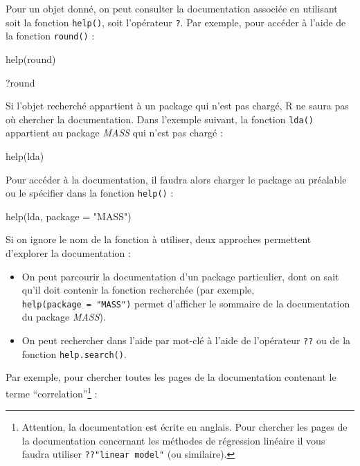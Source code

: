 \documentclass[
  french,
]{scrbook}
\newenvironment{Shaded}{\begin{snugshade}}{\end{snugshade}}
\newcommand{\AttributeTok}[1]{\textcolor[rgb]{0.77,0.63,0.00}{#1}}
\newcommand{\FunctionTok}[1]{\textcolor[rgb]{0.00,0.00,0.00}{#1}}
\newcommand{\NormalTok}[1]{#1}
\newcommand{\StringTok}[1]{\textcolor[rgb]{0.31,0.60,0.02}{#1}}
\providecommand{\tightlist}{%
  \setlength{\itemsep}{0pt}\setlength{\parskip}{0pt}}
\begin{document}
Pour un objet donné, on peut consulter la documentation associée en utilisant soit la fonction \texttt{help()}, soit l'opérateur \texttt{?}. Par exemple, pour accéder à l'aide de la fonction \texttt{round()} :

\begin{Shaded}
\begin{Highlighting}[]
\FunctionTok{help}\NormalTok{(round)}

\NormalTok{?round}
\end{Highlighting}
\end{Shaded}

Si l'objet recherché appartient à un package qui n'est pas chargé, R ne saura pas où chercher la documentation. Dans l'exemple suivant, la fonction \texttt{lda()} appartient au package \emph{MASS} qui n'est pas chargé :

\begin{Shaded}
\begin{Highlighting}[]
\FunctionTok{help}\NormalTok{(lda)}
\end{Highlighting}
\end{Shaded}

Pour accéder à la documentation, il faudra alors charger le package au préalable ou le spécifier dans la fonction \texttt{help()} :

\begin{Shaded}
\begin{Highlighting}[]
\FunctionTok{help}\NormalTok{(lda, }\AttributeTok{package =} \StringTok{"MASS"}\NormalTok{)}
\end{Highlighting}
\end{Shaded}

Si on ignore le nom de la fonction à utiliser, deux approches permettent d'explorer la documentation :

\begin{itemize}
\tightlist
\item
  On peut parcourir la documentation d'un package particulier, dont on sait qu'il doit contenir la fonction recherchée (par exemple, \texttt{help(package\ =\ "MASS")} permet d'afficher le sommaire de la documentation du package \emph{MASS}).
\item
  On peut rechercher dans l'aide par mot-clé à l'aide de l'opérateur \texttt{??} ou de la fonction \texttt{help.search()}.
\end{itemize}

Par exemple, pour chercher toutes les pages de la documentation contenant le terme ``correlation''\footnote{Attention, la documentation est écrite en anglais. Pour chercher les pages de la documentation concernant les méthodes de régression linéaire il vous faudra utiliser \texttt{??"linear\ model"} (ou similaire).} :
\end{document}
